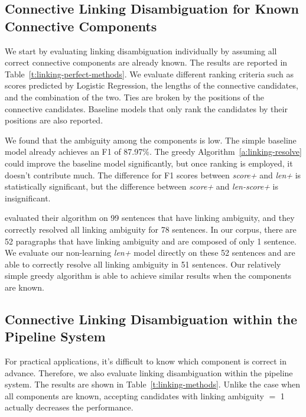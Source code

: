 \subsection{Connective Linking Disambiguation for Known Connective Components}

We start by evaluating linking disambiguation individually by assuming all correct
connective components are already known. The results are reported in
Table~\ref{t:linking-perfect-methods}.
We evaluate different ranking criteria such as scores predicted by
Logistic Regression, the lengths of the connective candidates, and the combination
of the two. Ties are broken by the positions of the connective candidates.
Baseline models that only rank the candidates by their positions are also reported.

We found that the ambiguity among the components is low. The simple
baseline model already achieves an F1 of 87.97\%. The greedy
Algorithm~\ref{a:linking-resolve} could improve the baseline
model significantly, but once ranking is employed, it doesn't contribute much.
The difference for F1 scores between \textit{score+} and \textit{len+} is statistically
significant, but the difference between \textit{score+} and \textit{len-score+}
is insignificant.




\cite{hu2011research} evaluated their algorithm on 99 sentences that have
linking ambiguity, and they correctly resolved all linking ambiguity for 78
sentences. In our corpus, there are 52 paragraphs that have linking ambiguity
and are composed of only 1 sentence. We evaluate our non-learning \textit{len+} model
directly on these 52 sentences and are able to correctly resolve all linking
ambiguity in 51 sentences. Our relatively simple greedy algorithm is
able to achieve similar results when the components are known.

\subsection{Connective Linking Disambiguation within the Pipeline System}

For practical applications, it's difficult to know which component is correct in
advance. Therefore, we also evaluate linking disambiguation within the pipeline
system. The results are shown in Table~\ref{t:linking-methods}. Unlike the case
when all components are known, accepting candidates with linking ambiguity $=$ 1 actually
decreases the performance.

